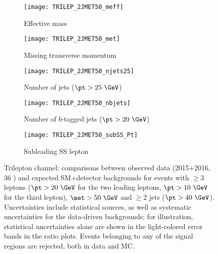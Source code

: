 \begin{figure}[t!]
\centering
\begin{subfigure}[t]{0.48\textwidth}
\texttt{[image: TRILEP\_2JMET50\_meff]}
\caption{Effective mass \meff}
\end{subfigure}
\begin{subfigure}[t]{0.48\textwidth}
\texttt{[image: TRILEP\_2JMET50\_met]}
\caption{Missing transverse momentum \met}
\end{subfigure}
\begin{subfigure}[t]{0.48\textwidth}
\texttt{[image: TRILEP\_2JMET50\_njets25]}
\caption{Number of jets ($\pt>25~\GeV$)}
\end{subfigure}
\begin{subfigure}[t]{0.48\textwidth}
\texttt{[image: TRILEP\_2JMET50\_nbjets]}
\caption{Number of $b$-tagged jets ($\pt>20~\GeV$)}
\end{subfigure}
\begin{subfigure}[t]{0.48\textwidth}
\texttt{[image: TRILEP\_2JMET50\_subSS\_Pt]}
\caption{Subleading SS lepton \pt}
\end{subfigure}
\caption{Trilepton channel: comparisons between observed data (2015+2016, 36 \ifb) and expected SM+detector backgrounds 
for events with $\ge 3$ leptons ($\pt>20~\GeV$ for the two leading leptons, $\pt>10~\GeV$ for the third lepton), $\met>50~\GeV$ and $\ge 2$ jets ($\pt>40~\GeV$). 
Uncertainties include statistical sources, as well as systematic uncertainties for the data-driven backgrounds; 
for illustration, statistical uncertainties alone are shown in the light-colored error bands in the ratio plots. 
Events belonging to any of the signal regions are rejected, both in data and MC.  
}
\label{fig:distributions_channel3L_2015}
\end{figure} 
